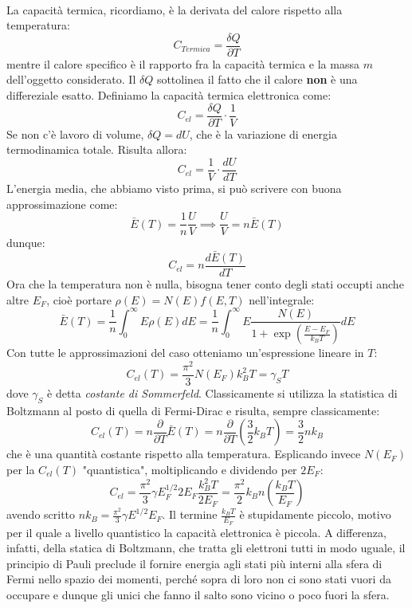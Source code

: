 \documentclass{book}
\begin{document}
            \paragraph{}
                La capacità termica, ricordiamo, è la derivata del calore rispetto alla temperatura:
                $$C_{Termica} = \frac{\delta Q}{\partial T}$$
                mentre il calore specifico è il rapporto fra la capacità termica e la massa $m$ dell'oggetto considerato. Il $\delta Q$ sottolinea il fatto che il calore \textbf{non} è una differeziale esatto. 
                Definiamo la capacità termica elettronica come:
                $$C_{el} = \frac{\delta Q}{\partial T} \cdot\frac{1}{V}$$
                Se non c'è lavoro di volume, $\delta Q = dU$, che è la variazione di energia termodinamica totale. Risulta allora:
                $$C_{el} = \frac{1}{V} \cdot \frac{dU}{dT}$$
                L'energia media, che abbiamo visto prima, si può scrivere con buona approssimazione come:
                $$\bar{E}(T) = \frac{1}{n} \frac{U}{V} \implies \frac{U}{V} = n\bar{E}(T)$$
                dunque:
                $$C_{el} = n \frac{d\bar{E}(T)}{dT}$$
                Ora che la temperatura non è nulla, bisogna tener conto degli stati occupti anche altre $E_{F}$, cioè portare $\rho(E) = N(E)f(E,T)$ nell'integrale:
                $$\bar{E}(T) = \frac{1}{n} \int_{0} ^{\infty} E \rho(E)dE = \frac{1}{n} \int_{0} ^{\infty} E\frac{N(E)}{1+\exp{(\frac{E-E_{F}}{k_{B}T})}}dE$$
                Con tutte le approssimazioni del caso otteniamo un'espressione lineare in $T$:
                $$C_{el}(T) = \frac{\pi ^{2}}{3} N(E_{F}) k_{B} ^{2} T = \gamma_{S} T$$
                dove $\gamma_{S}$ è detta \textit{costante di Sommerfeld}.
                Classicamente si utilizza la statistica di Boltzmann al posto di quella di Fermi-Dirac e risulta, sempre classicamente:
                $$C_{el}(T) = n \frac{\partial}{\partial T} \bar{E}(T) = n \frac{\partial}{\partial T} (\frac{3}{2}k_{B}T) = \frac{3}{2}nk_{B}$$
                che è una quantità costante rispetto alla temperatura.
                Esplicando invece $N(E_{F})$ per la $C_{el}(T)$ "quantistica", moltiplicando e dividendo per $2E_{F}$:
                $$C_{el} = \frac{\pi ^{2}}{3} \gamma E_{F} ^{1/2}2E_{F} \frac{k_{B} ^{2}T}{2E_{F}} = \frac{\pi ^{2}}{2}k_{B} n(\frac{k_{B}T}{E_{F}})$$
                avendo scritto $nk_{B} =\displaystyle \frac{\pi^{2}}{3} \gamma E^{1/2} E_{F}$.
                Il termine $\frac{k_{B}T}{E_{F}}$ è stupidamente piccolo, motivo per il quale a livello quantistico la capacità elettronica è piccola. A differenza, infatti, della statica di Boltzmann, che tratta gli elettroni tutti in modo uguale, il principio di Pauli preclude il fornire energia agli stati più interni alla sfera di Fermi nello spazio dei momenti, perché sopra di loro non ci sono stati vuori da occupare e dunque gli unici che fanno il salto sono vicino o poco fuori la sfera.
\end{document}
